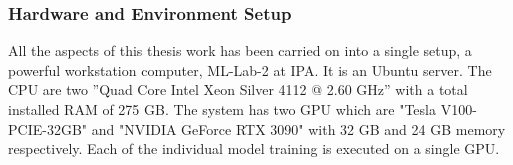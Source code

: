 \subsubsection{Hardware and Environment Setup}
\label{sec:hardware}
All the aspects of this thesis work has been carried on into a single setup, a powerful workstation computer, ML-Lab-2 at \ac{IPA}. It is an Ubuntu server. The \ac{CPU} are two ”Quad Core Intel Xeon Silver 4112 @ 2.60 GHz” with a total installed \ac{RAM} of 275 GB. The system has two \ac{GPU} which are "Tesla V100-PCIE-32GB" and "NVIDIA GeForce RTX 3090" with 32 \ac{GB} and 24 \ac{GB} memory respectively. Each of the individual model training is executed on a single GPU. 
\cleardoublepage


